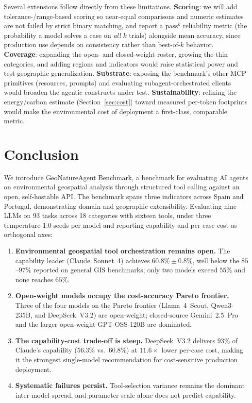 \documentclass[sigconf]{acmart}
\begin{document}
Several extensions follow directly from these limitations. \textbf{Scoring}: we will add tolerance-/range-based scoring so near-equal comparisons and numeric estimates are not failed by strict binary matching, and report a $\mathrm{pass}^{k}$ reliability metric (the probability a model solves a case on \emph{all} $k$ trials) alongside mean accuracy, since production use depends on consistency rather than best-of-$k$ behavior. \textbf{Coverage}: expanding the open- and closed-weight roster, growing the thin categories, and adding regions and indicators would raise statistical power and test geographic generalization. \textbf{Substrate}: exposing the benchmark's other MCP primitives (resources, prompts) and evaluating subagent-orchestrated clients would broaden the agentic constructs under test. \textbf{Sustainability}: refining the energy/carbon estimate (Section~\ref{sec:cost}) toward measured per-token footprints would make the environmental cost of deployment a first-class, comparable metric.


\section{Conclusion}
\label{sec:conclusion}

We introduce GeoNatureAgent Benchmark, a benchmark for evaluating AI agents on environmental geospatial analysis through structured tool calling against an open, self-hostable API. The benchmark spans three indicators across Spain and Portugal, demonstrating domain and geographic extensibility. Evaluating nine LLMs on $93$ tasks across 18 categories with sixteen tools, under three temperature-1.0 seeds per model and reporting capability and per-case cost as orthogonal axes:

\begin{enumerate}
    \item \textbf{Environmental geospatial tool orchestration remains open.} The capability leader (Claude~Sonnet~4) achieves $60.8\% \pm 0.8\%$, well below the $85$--$97\%$ reported on general GIS benchmarks; only two models exceed $55\%$ and none reaches $65\%$.
    \item \textbf{Open-weight models occupy the cost-accuracy Pareto frontier.} Three of the four models on the Pareto frontier (Llama~4~Scout, Qwen3-235B, and DeepSeek~V3.2) are open-weight; closed-source Gemini~2.5~Pro and the larger open-weight GPT-OSS-120B are dominated.
    \item \textbf{The capability-cost trade-off is steep.} DeepSeek~V3.2 delivers $93\%$ of Claude's capability ($56.3\%$ vs.\ $60.8\%$) at $11.6\times$ lower per-case cost, making it the strongest single-model recommendation for cost-sensitive production deployment.
    \item \textbf{Systematic failures persist.} Tool-selection variance remains the dominant inter-model spread, and parameter scale alone does not predict capability.
\end{enumerate}
\end{document}
